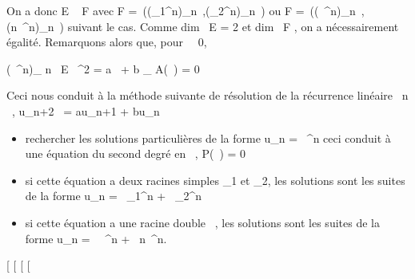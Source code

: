 \documentclass[]{article}
\begin{document}
On a donc E \subset~ F avec F =\
\mathrmVect((\lambda_1^n)_n\in{}~,(\lambda_2^n)_n\in{}~)
ou F =\
\mathrmVect((\lambda~^n)_n\in{}~,(n\lambda~^n)_n\in\mathbb{N}~)
suivant le cas. Comme dim~ E = 2 et
dim~ F \leq 2, on a nécessairement égalité.
Remarquons alors que, pour \lambda~\neq~0,

(\lambda~^n)_ n\in{}~ \in E\quad
\Leftrightarrow \lambda~^2 = a\lambda~ + b
\Leftrightarrow \chi_ A(\lambda~) = 0

Ceci nous conduit à la méthode suivante de résolution de la récurrence
linéaire \forall~n \in {}~, u_n+2~ =
au_n+1 + bu_n

\begin{itemize}
\itemsep1pt\parskip0pt
\item
  rechercher les solutions particulières de la forme u_n =
  \lambda~^n ceci conduit à une équation du second degré en \lambda~, P(\lambda~)
  = 0
\item
  si cette équation a deux racines simples \lambda_1 et \lambda_2,
  les solutions sont les suites de la forme u_n =
  \alpha~\lambda_1^n + \beta~\lambda_2^n
\item
  si cette équation a une racine double \lambda~, les solutions sont les suites
  de la forme u_n = \alpha~\lambda~^n + \beta~n\lambda~^n.
\end{itemize}

{[}
{[}
{[}
{[}
\end{document}
